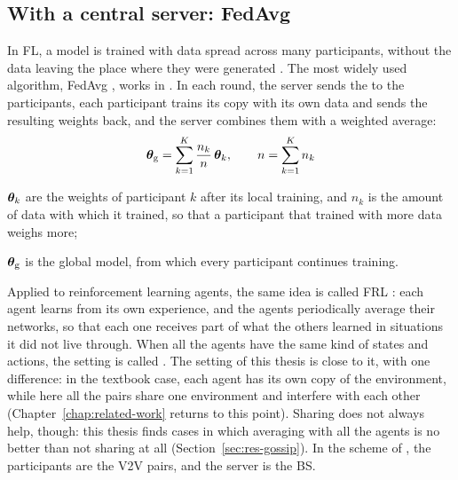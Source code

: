 \subsection{With a central server: FedAvg}

In \ac{FL}, a model is trained with data spread across many participants, without the data leaving the place
where they were generated \cite{mcmahan+17fedavg,kairouz+21advances}. The most widely used algorithm,
\ac{FedAvg} \cite{mcmahan+17fedavg}, works in . In each round, the server sends the
 to the participants, each participant trains its copy with its own data and sends the
resulting weights back, and the server combines them with a weighted average:
\begin{equation}
  \bm{\theta}_{\mathrm{g}} = \sum_{k=1}^{K} \frac{n_k}{n}\, \bm{\theta}_k , \qquad n = \sum_{k=1}^{K} n_k
  \label{eq:bg-fedavg}
\end{equation}
\begin{wherelist}
  \item $\bm{\theta}_k$ are the weights of participant $k$ after its local training, and $n_k$ is the amount of
    data with which it trained, so that a participant that trained with more data weighs more;
  \item $\bm{\theta}_{\mathrm{g}}$ is the global model, from which every participant continues training.
\end{wherelist}

Applied to reinforcement learning agents, the same idea is called \ac{FRL} \cite{qi+21frl}: each agent learns
from its own experience, and the agents periodically average their networks, so that each one receives part
of what the others learned in situations it did not live through. When all the agents have the same kind of
states and actions, the setting is called . The setting
of this thesis is close to it, with one difference: in the textbook case, each agent has its own copy of the
environment, while here all the pairs share one environment and interfere with each other
(Chapter~\ref{chap:related-work} returns to this point). Sharing does not always help, though: this thesis
finds cases in
which averaging with all the agents is no better than not sharing at all (Section~\ref{sec:res-gossip}). In
the scheme of \citet{li+22fedmarl}, the participants are the \ac{V2V} pairs, and the server is the \ac{BS}.

